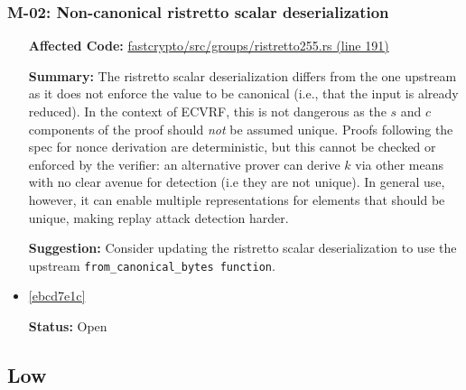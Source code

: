\subsubsection*{M-02: Non-canonical ristretto scalar deserialization}
\begin{itemize}[align=left]
\item[\textbf{Affected Code:}] \href{https://github.com/MystenLabs/fastcrypto/blob/963205c6d0538fe548b8b10037cf87a53af6f424/fastcrypto/src/groups/ristretto255.rs#L191}{fastcrypto/src/groups/ristretto255.rs (line 191)}
\item[\textbf{Summary:}] The ristretto scalar deserialization differs from the one upstream as it does not enforce the value to be canonical (i.e., that the input is already reduced). In the context of ECVRF, this is not dangerous as the $s$ and $c$ components of the proof should \emph{not} be assumed unique. Proofs following the spec for nonce derivation are deterministic, but this cannot be checked or enforced by the verifier: an alternative prover can derive $k$ via other means with no clear avenue for detection (i.e they are not unique). In general use, however, it can enable multiple representations for elements that should be unique, making replay attack detection harder.
\item[\textbf{Suggestion:}] Consider updating the ristretto scalar deserialization to use the upstream \lstinline{from_canonical_bytes function}.
\item[\textbf{Suggested Fix:}] \href{https://github.com/MystenLabs/fastcrypto/pull/543/commits/ebcd7e1c8e6f0bbf48667f995017151a20289886}{[ebcd7e1c]}
\item[\textbf{Status:}] Open
\end{itemize}

\subsection{Low}
